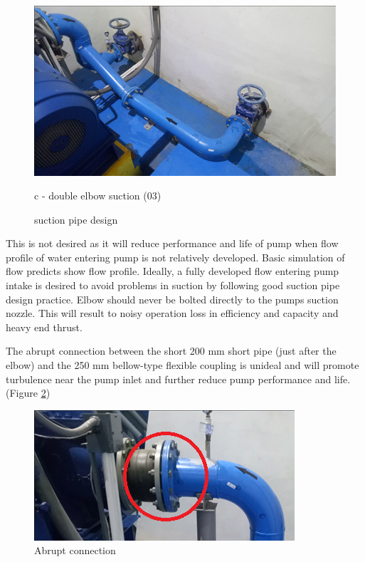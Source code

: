 \begin{figure}[!htb]
	\begin{minipage}[b]{0.3\linewidth}
		\centering
		\includegraphics[width=\textwidth]{figures/ch043_double_elbow_suction3}
		\caption*{c - double elbow suction (03)}
		\label{ch043_double_elbow_suction3}
	\end{minipage}
\caption{suction pipe design}
\label{ch043_spd}
\end{figure}

This is not desired as it will reduce performance and life of pump when flow profile of water entering pump is not relatively developed. Basic simulation of flow predicts show flow profile. Ideally, a fully developed flow entering pump intake is desired to avoid problems in suction by following good suction pipe design practice. Elbow should never be bolted directly to the pumps suction nozzle. This will result to noisy operation loss in efficiency and capacity and heavy end thrust.

The abrupt connection between the short 200 mm short pipe (just after the elbow) and the 250 mm bellow-type flexible coupling is unideal and will promote turbulence near the pump inlet and further reduce pump performance and life.(Figure \ref{ch043_elbow_to_fj_connection})

\begin{figure}[h]
	\includegraphics[scale=0.6]{figures/ch043_elbow_to_fj_connection} 
	\caption{Abrupt connection}
	\label{ch043_elbow_to_fj_connection}
\end{figure} 



